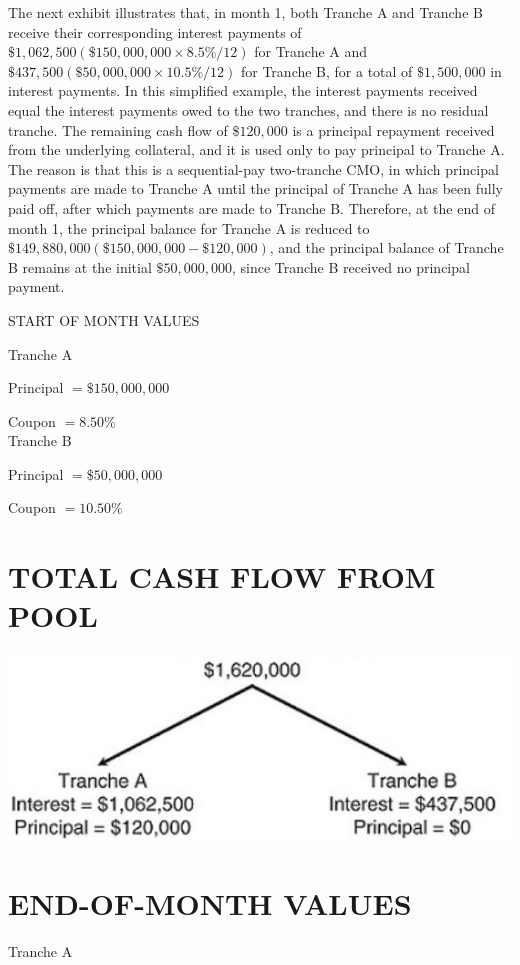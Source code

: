 \documentclass[11pt]{article}
\begin{document}
The next exhibit illustrates that, in month 1, both Tranche A and Tranche B receive their corresponding interest payments of $\$ 1,062,500(\$ 150,000,000 \times 8.5 \% / 12)$ for Tranche A and $\$ 437,500(\$ 50,000,000 \times 10.5 \% / 12)$ for Tranche B, for a total of $\$ 1,500,000$ in interest payments. In this simplified example, the interest payments received equal the interest payments owed to the two tranches, and there is no residual tranche. The remaining cash flow of $\$ 120,000$ is a principal repayment received from the underlying collateral, and it is used only to pay principal to Tranche A. The reason is that this is a sequential-pay two-tranche CMO, in which principal payments are made to Tranche A until the principal of Tranche A has been fully paid off, after which payments are made to Tranche B. Therefore, at the end of month 1, the principal balance for Tranche A is reduced to $\$ 149,880,000(\$ 150,000,000-\$ 120,000)$, and the principal balance of Tranche B remains at the initial $\$ 50,000,000$, since Tranche B received no principal payment.

START OF MONTH VALUES

Tranche A

Principal $=\$ 150,000,000$

Coupon $=8.50 \%$\\
Tranche B

Principal $=\$ 50,000,000$

Coupon $=10.50 \%$

\section*{TOTAL CASH FLOW FROM POOL}
\begin{center}
\includegraphics[max width=\textwidth]{2024_04_09_08813c5d5454963abf79g-3}
\end{center}

\section*{END-OF-MONTH VALUES}
Tranche A
\end{document}
